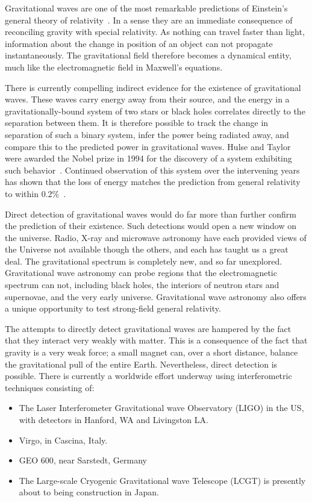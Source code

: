 Gravitational waves are one of the most remarkable predictions of
Einstein's general theory of relativity~\cite{Einstein:1916}.  In a
sense they are an immediate consequence of reconciling gravity with
special relativity.  As nothing can travel faster than light,
information about the change in position of an object can not
propagate instantaneously.  The gravitational field therefore becomes
a dynamical entity, much like the electromagnetic field in Maxwell's
equations.

There is currently compelling indirect evidence for the existence of
gravitational waves.  These waves carry energy away from their source,
and the energy in a gravitationally-bound system of two stars or black
holes correlates directly to the separation between them.  It is
therefore possible to track the change in separation of such a binary
system, infer the power being radiated away, and compare this to the
predicted power in gravitational waves.  Hulse and Taylor were awarded
the Nobel prize in 1994 for the discovery of a system exhibiting such
behavior~\cite{Hulse:1994, Taylor:1994}. Continued observation of this
system over the intervening years has shown that the loss of energy
matches the prediction from general relativity to within
0.2\%~\cite{Weisberg:2004hi}.


Direct detection of gravitational waves would do far more than further
confirm the prediction of their existence.  Such detections would open
a new window on the universe.  Radio, X-ray and microwave astronomy
have each provided views of the Universe not available though the
others, and each has taught us a great deal.  The gravitational
spectrum is completely new, and so far unexplored.  Gravitational wave
astronomy can probe regions that the electromagnetic spectrum can not,
including black holes, the interiors of neutron stars and supernovae,
and the very early universe.  Gravitational wave astronomy also offers
a unique opportunity to test strong-field general relativity.

The attempts to directly detect gravitational waves are hampered by
the fact that they interact very weakly with matter.  This is a
consequence of the fact that gravity is a very weak force; a small
magnet can, over a short distance, balance the gravitational pull of
the entire Earth.  Nevertheless, direct detection is possible.  There
is currently a worldwide effort underway using interferometric
techniques consisting of:

\begin{itemize}

\item The Laser Interferometer Gravitational wave Observatory (LIGO)
in the US, with detectors in Hanford, WA and Livingston LA.

\item Virgo, in Cascina, Italy.

\item GEO 600, near Sarstedt, Germany

\item The Large-scale Cryogenic Gravitational wave Telescope (LCGT) is
presently about to being construction in Japan.
\end{itemize}

